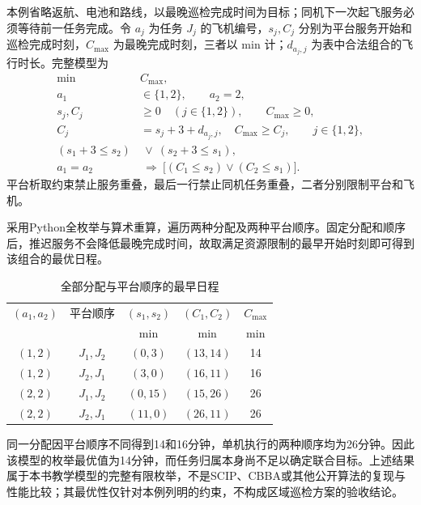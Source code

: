 本例省略返航、电池和路线，以最晚巡检完成时间为目标；同机下一次起飞服务必须等待前一任务完成。令 $a_j$ 为任务 $J_j$ 的飞机编号，$s_j,C_j$ 分别为平台服务开始和巡检完成时刻，$C_{\max}$ 为最晚完成时刻，三者以 $\mathrm{min}$ 计；$d_{a_j,j}$ 为表中合法组合的飞行时长。完整模型为
\begin{align}
\label{s0309:example_model}
\min\;&C_{\max},\\
a_1&\in\{1,2\},\qquad a_2=2,\\
s_j,C_j&\geq0\quad(j\in\{1,2\}),\qquad C_{\max}\geq0,\\
C_j&=s_j+3+d_{a_j,j},\quad
C_{\max}\geq C_j,\qquad j\in\{1,2\},\\
(s_1+3\leq s_2)&\ \lor\ (s_2+3\leq s_1),\\
a_1=a_2&\ \Longrightarrow\
\bigl[(C_1\leq s_2)\lor(C_2\leq s_1)\bigr].
\end{align}
平台析取约束禁止服务重叠，最后一行禁止同机任务重叠，二者分别限制平台和飞机。

采用Python全枚举与算术重算，遍历两种分配及两种平台顺序。固定分配和顺序后，推迟服务不会降低最晚完成时间，故取满足资源限制的最早开始时刻即可得到该组合的最优日程。
\begin{table}[htbp]
\centering
\caption{全部分配与平台顺序的最早日程}
\label{s0309:enumeration}
\begin{tabular}{ccccc}
\toprule
$(a_1,a_2)$ & 平台顺序 & $(s_1,s_2)$ & $(C_1,C_2)$ & $C_{\max}$\\
 & & $\mathrm{min}$ & $\mathrm{min}$ & $\mathrm{min}$\\
\midrule
$(1,2)$ & $J_1,J_2$ & $(0,3)$ & $(13,14)$ & 14\\
$(1,2)$ & $J_2,J_1$ & $(3,0)$ & $(16,11)$ & 16\\
$(2,2)$ & $J_1,J_2$ & $(0,15)$ & $(15,26)$ & 26\\
$(2,2)$ & $J_2,J_1$ & $(11,0)$ & $(26,11)$ & 26\\
\bottomrule
\end{tabular}
\end{table}

同一分配因平台顺序不同得到14和16分钟，单机执行的两种顺序均为26分钟。因此该模型的枚举最优值为14分钟，而任务归属本身尚不足以确定联合目标。上述结果属于本书教学模型的完整有限枚举，不是SCIP、CBBA或其他公开算法的复现与性能比较；其最优性仅针对本例列明的约束，不构成区域巡检方案的验收结论。
